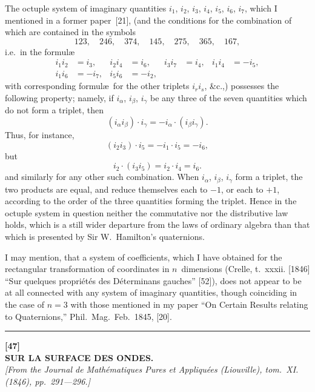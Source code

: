 \documentclass[11pt,a4paper]{book}
\begin{document}
\vspace{6pt}

The octuple system of imaginary quantities $i_1$, $i_2$, $i_3$, $i_4$, $i_5$, $i_6$, $i_7$, which I mentioned in a former paper~[21], (and the conditions for the combination of which are contained in the symbols
\[
123, \quad 246, \quad 374, \quad 145, \quad 275, \quad 365, \quad 167,
\]
i.e.\ in the formul\ae
\begin{align*}
i_1 i_2 &= i_3, & i_2 i_4 &= i_6, & i_3 i_7 &= i_4, & i_1 i_4 &= -i_5, \\
i_1 i_6 &= -i_7, & i_5 i_6 &= -i_2, &
\end{align*}
with corresponding formul\ae\ for the other triplets $i_r i_s$, \&c.,) possesses the following property; namely, if $i_\alpha$, $i_\beta$, $i_\gamma$ be any three of the seven quantities which do not form a triplet, then
\[
(i_\alpha i_\beta) \cdot i_\gamma = -i_\alpha \cdot (i_\beta i_\gamma).
\]
Thus, for instance,
\[
(i_2 i_3) \cdot i_5 = -i_1 \cdot i_5 = -i_6,
\]
but
\[
i_2 \cdot (i_3 i_5) = i_2 \cdot i_4 = i_6.
\]
and similarly for any other such combination. When $i_\alpha$, $i_\beta$, $i_\gamma$ form a triplet, the two products are equal, and reduce themselves each to $-1$, or each to $+1$, according to the order of the three quantities forming the triplet. Hence in the octuple system in question neither the commutative nor the distributive law holds, which is a still wider departure from the laws of ordinary algebra than that which is presented by Sir W.~Hamilton's quaternions.

I may mention, that a system of coefficients, which I have obtained for the rectangular transformation of coordinates in $n$~dimensions (Crelle, t.~xxxii. [1846] ``Sur quelques propri\'et\'es des D\'eterminans gauches'' [52]), does not appear to be at all connected with any system of imaginary quantities, though coinciding in the case of $n=3$ with those mentioned in my paper ``On Certain Results relating to Quaternions,'' Phil.\ Mag.\ Feb.\ 1845, [20].

\vspace{20pt}
\begin{center}
\rule{0.5\textwidth}{0.4pt}
\end{center}


\newpage
{}
\begin{center}
\textbf{[47]}\\[4pt]
\textbf{\large SUR LA SURFACE DES ONDES.}\\[4pt]
\textit{[From the Journal de Math\'ematiques Pures et Appliqu\'ees (Liouville), tom.~XI. (1846), pp.~291---296.]}
\end{center}
\end{document}
